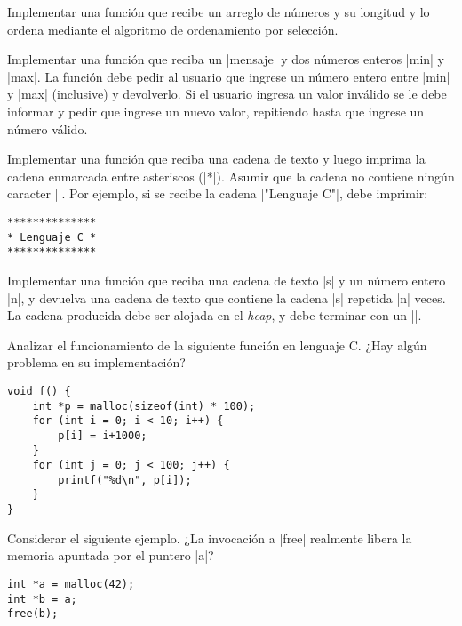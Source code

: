 \begin{ejercicio}
Implementar una función que recibe un arreglo de números y su longitud y
lo ordena mediante el algoritmo de ordenamiento por selección.
\end{ejercicio}

\begin{ejercicio}
Implementar una función que reciba un |mensaje| y dos números enteros |min| y
|max|. La función debe pedir al usuario que ingrese un número entero entre
|min| y |max| (inclusive) y devolverlo. Si el usuario ingresa un valor
inválido se le debe informar y pedir que ingrese un nuevo valor, repitiendo
hasta que ingrese un número válido.
\end{ejercicio}

\begin{ejercicio}
Implementar una función que reciba una cadena de texto y
luego imprima la cadena enmarcada entre asteriscos (|*|). Asumir que la cadena
no contiene ningún caracter |\n|. Por ejemplo, si se recibe la cadena
|"Lenguaje C"|, debe imprimir:

\begin{verbatim}
**************
* Lenguaje C *
**************
\end{verbatim}
\end{ejercicio}

\begin{ejercicio}
Implementar una función que reciba una cadena de texto |s| y un número entero |n|, y
devuelva una cadena de texto que contiene la cadena |s| repetida |n| veces.
La cadena producida debe ser alojada en el \emph{heap}, y debe terminar con un
|\0|.
\end{ejercicio}

\begin{ejercicio}
Analizar el funcionamiento de la siguiente función en lenguaje C. ¿Hay algún
problema en su implementación?

\begin{lstlisting}[numbers=none]
void f() {
    int *p = malloc(sizeof(int) * 100);
    for (int i = 0; i < 10; i++) {
        p[i] = i+1000;
    }
    for (int j = 0; j < 100; j++) {
        printf("%d\n", p[i]);
    }
}
\end{lstlisting}
\end{ejercicio}

\begin{ejercicio}
Considerar el siguiente ejemplo. ¿La invocación a |free| realmente libera la
memoria apuntada por el puntero |a|?

\begin{lstlisting}[numbers=none]
int *a = malloc(42);
int *b = a;
free(b);
\end{lstlisting}
\end{ejercicio}

